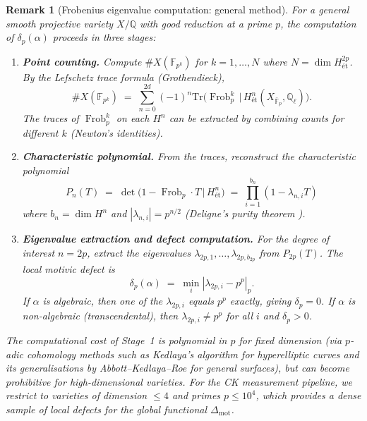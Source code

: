 \documentclass[11pt]{article}
\newtheorem{remark}[theorem]{Remark}
\theoremstyle{definition}
\DeclareMathOperator{\Frob}{Frob}
\begin{document}
\begin{remark}[Frobenius eigenvalue computation: general method]
\label{rem:frob-general}
For a general smooth projective variety $X/\mathbb{Q}$ with good reduction
at a prime $p$, the computation of $\delta_p(\alpha)$ proceeds in three
stages:

\begin{enumerate}[label=\textbf{Stage \arabic*.}]
  \item \textbf{Point counting.}
    Compute $\#X(\mathbb{F}_{p^k})$ for $k = 1, \ldots, N$ where
    $N = \dim H^{2p}_{\text{\'et}}$.  By the Lefschetz trace formula
    (Grothendieck),
    \[
      \#X(\mathbb{F}_{p^k})
      \;=\;
      \sum_{n=0}^{2d} (-1)^n \mathrm{Tr}\bigl(\Frob_p^k \,\big|\,
      H^n_{\text{\'et}}(X_{\bar{\mathbb{F}}_p}, \mathbb{Q}_\ell)\bigr).
    \]
    The traces of $\Frob_p^k$ on each $H^n$ can be extracted by
    combining counts for different $k$ (Newton's identities).

  \item \textbf{Characteristic polynomial.}
    From the traces, reconstruct the characteristic polynomial
    \[
      P_n(T) \;=\; \det\bigl(1 - \Frob_p \cdot T \,\big|\,
      H^n_{\text{\'et}}\bigr)
      \;=\;
      \prod_{i=1}^{b_n} (1 - \lambda_{n,i} T)
    \]
    where $b_n = \dim H^n$ and $|\lambda_{n,i}| = p^{n/2}$ (Deligne's
    purity theorem \cite{Deligne-Weil}).

  \item \textbf{Eigenvalue extraction and defect computation.}
    For the degree of interest $n = 2p$, extract the eigenvalues
    $\lambda_{2p,1}, \ldots, \lambda_{2p,b_{2p}}$ from $P_{2p}(T)$.
    The local motivic defect is
    \[
      \delta_p(\alpha)
      \;=\;
      \min_i |\lambda_{2p,i} - p^p|_p.
    \]
    If $\alpha$ is algebraic, then one of the $\lambda_{2p,i}$ equals
    $p^p$ exactly, giving $\delta_p = 0$.  If $\alpha$ is non-algebraic
    (transcendental), then $\lambda_{2p,i} \neq p^p$ for all $i$ and
    $\delta_p > 0$.
\end{enumerate}

\noindent
The computational cost of Stage~1 is polynomial in $p$ for fixed
dimension (via $p$-adic cohomology methods such as Kedlaya's algorithm
for hyperelliptic curves and its generalisations by Abbott--Kedlaya--Roe
for general surfaces), but can become prohibitive for high-dimensional
varieties.  For the CK measurement pipeline, we restrict to varieties
of dimension $\leq 4$ and primes $p \leq 10^4$, which provides a dense
sample of local defects for the global functional
$\Delta_{\mathrm{mot}}$.
\end{remark}
\end{document}
